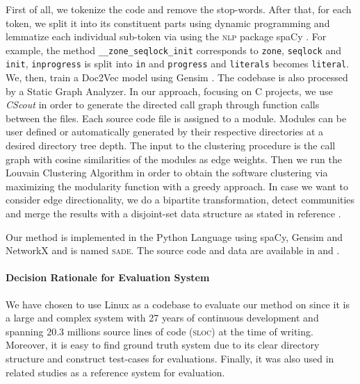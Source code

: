 \documentclass[sigconf]{acmart}
\begin{document}
First of all, we tokenize the code and remove the stop-words. 
After that, for each token, we split it into its constituent parts using dynamic programming \cite{wordninja} and lemmatize 
each individual sub-token via using the \textsc{nlp} package spaCy \cite{spacy}. 
For example, the method \texttt{\_\_zone\_seqlock\_init} corresponds to \texttt{zone}, \texttt{seqlock} and \texttt{init}, 
\texttt{inprogress} is split into \texttt{in} and \texttt{progress} and \texttt{literals} becomes \texttt{literal}.
We, then, train a Doc2Vec model using Gensim \cite{gensim}. 
The codebase is also processed by a Static Graph Analyzer. 
In our approach, focusing on C projects, we use \emph{CScout} \cite{cscout} in order to generate the directed call graph through function calls between the files. 
Each source code file is assigned to a module. 
Modules can be user defined or automatically generated by their respective directories at a desired directory tree depth. 
The input to the clustering procedure
is the call graph with cosine similarities of the modules as edge weights.
Then we run the Louvain Clustering Algorithm \cite{louvain} in
order to obtain the software clustering via maximizing the modularity function with a greedy approach. 
In case we want to consider edge directionality, we do a bipartite transformation, detect communities and
merge the results with a disjoint-set data structure as stated in reference \cite{malliaros}.
    
Our method is implemented in the Python Language using spaCy\cite{spacy}, Gensim \cite{gensim} and NetworkX \cite{nx} and is named \textsc{sade}. The source code and data are available in \cite{source_code} and \cite{call_graph}. 

\paragraph{Decision Rationale for Evaluation System} 
We have chosen to use Linux as a codebase to evaluate our method on 
since it is a large and complex system with 27 years of continuous development and spanning 20.3 millions source lines of code (\textsc{sloc}) at the time of writing.  
Moreover, it is easy to find ground truth system due to its clear directory structure and construct test-cases for
evaluations. 
Finally, it was also used in related studies \cite{acdc, evaluation} as a reference system for evaluation.  
\end{document}
